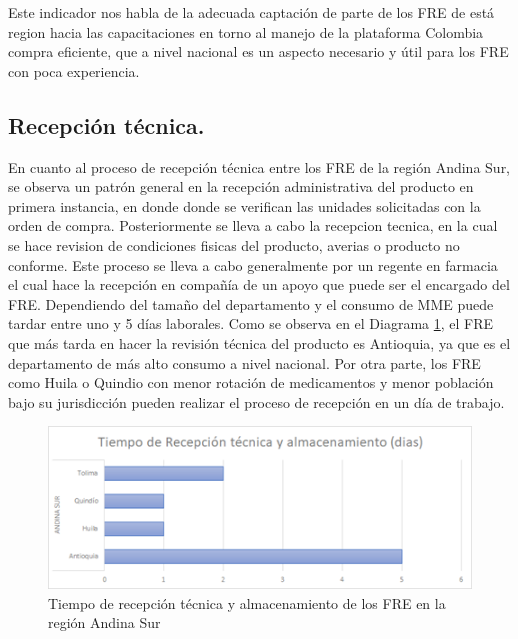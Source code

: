 \documentclass[
]{book}
\begin{document}
Este indicador nos habla de la adecuada captación de parte de los FRE de está region hacia las capacitaciones en torno al manejo de la plataforma Colombia compra eficiente, que a nivel nacional es un aspecto necesario y útil para los FRE con poca experiencia.

\hypertarget{recepciuxf3n-tuxe9cnica.-1}{%
\subsection{Recepción técnica.}\label{recepciuxf3n-tuxe9cnica.-1}}

En cuanto al proceso de recepción técnica entre los FRE de la región Andina Sur, se observa un patrón general en la recepción administrativa del producto en primera instancia, en donde donde se verifican las unidades solicitadas con la orden de compra. Posteriormente se lleva a cabo la recepcion tecnica, en la cual se hace revision de condiciones fisicas del producto, averias o producto no conforme. Este proceso se lleva a cabo generalmente por un regente en farmacia el cual hace la recepción en compañía de un apoyo que puede ser el encargado del FRE. Dependiendo del tamaño del departamento y el consumo de MME puede tardar entre uno y 5 días laborales. Como se observa en el Diagrama \ref{fig:TiempoRecepcionTecnicaRegionAndinaSur}, el FRE que más tarda en hacer la revisión técnica del producto es Antioquia, ya que es el departamento de más alto consumo a nivel nacional. Por otra parte, los FRE como Huila o Quindio con menor rotación de medicamentos y menor población bajo su jurisdicción pueden realizar el proceso de recepción en un día de trabajo.

\begin{figure}

{\centering \includegraphics[width=0.8\linewidth]{figures/Imagen22} 

}

\caption{Tiempo de recepción técnica y almacenamiento de los FRE en la región Andina Sur}\label{fig:TiempoRecepcionTecnicaRegionAndinaSur}
\end{figure}
\end{document}
